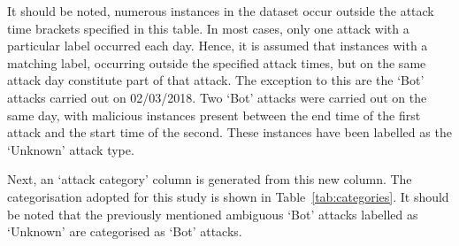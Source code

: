 It should be noted, numerous instances in the dataset occur outside the attack
time brackets specified in this table. In most cases, only one attack with a
particular label occurred each day. Hence, it is assumed that instances with a
matching label, occurring outside the specified attack times, but on the same
attack day constitute part of that attack. The exception to this are the `Bot'
attacks carried out on 02/03/2018. Two `Bot' attacks were carried out on the
same day, with malicious instances present between the end time of the first
attack and the start time of the second. These instances have been labelled as
the `Unknown' attack type.

Next, an `attack category' column is generated from this new column. The
categorisation adopted for this study is shown in Table~\ref{tab:categories}.
It should be noted that the previously mentioned ambiguous `Bot' attacks
labelled as `Unknown' are categorised as `Bot' attacks.

